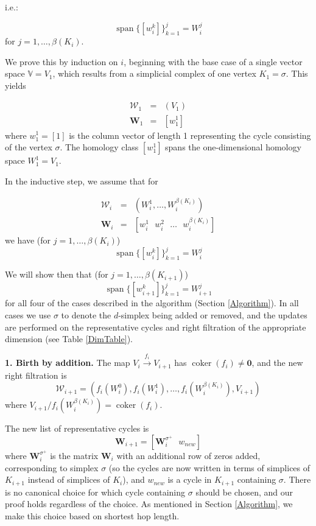 \documentclass[12pt]{article}
\DeclareMathOperator{\coker}{coker}
\DeclareMathOperator{\spn}{span}
\begin{document}
i.e.:

\begin{equation}
\spn \{[w_i^k]\}_{k=1}^j = W_i^j
\end{equation}
for $j = 1,\ldots,\beta(K_i)$.

We prove this by induction on $i$, beginning with the base case of a single vector space $\mathbb{V} = V_1$, which results from a simplicial complex of one vertex $K_1 = \sigma$. This yields

\begin{eqnarray}
\mathcal{W}_1 & = & (V_1) \nonumber \\
\mathbf{W}_1 & = & [w_1^1] \nonumber
\end{eqnarray}
where $w_1^1 = [1]$ is the column vector of length 1 representing the cycle consisting of the vertex $\sigma$. The homology class $[w_1^1]$ spans the one-dimensional homology space $W_1^1 = V_1$.

In the inductive step, we assume that for

\begin{eqnarray}
\mathcal{W}_i & = & (W_i^1, \ldots, W_i^{\beta(K_i)}) \\
\mathbf{W}_i & = & [ w_i^1 \mbox{ } w_i^2 \mbox{ } \ldots \mbox{ } w_i^{\beta(K_i)}]
\end{eqnarray}
we have (for $j = 1,\ldots,\beta(K_i)$)
\[ \spn \{[w_i^k]\}_{k=1}^j = W_i^j \]

We will show then that (for $j = 1,\ldots,\beta(K_{i+1})$)
\begin{equation}
\spn \{[w_{i+1}^k]\}_{k=1}^j = W_{i+1}^j
\end{equation}
for all four of the cases described in the algorithm (Section \ref{Algorithm}). In all cases we use $\sigma$ to denote the $d$-simplex being added or removed, and the updates are performed on the representative cycles and right filtration of the appropriate dimension (see Table \ref{DimTable}).

\textbf{1. Birth by addition.} The map $V_i \overset{f_i}{\longrightarrow} V_{i+1}$ has $\coker(f_i) \neq \textbf{0}$, and the new right filtration is
\[ \mathcal{W}_{i+1} = (f_i(W_i^0), f_i(W_i^1), \ldots, f_i(W_i^{\beta(K_i)}), V_{i+1}) \]
where $V_{i+1}/f_i(W_i^{\beta(K_i)}) = \coker(f_i)$.

The new list of representative cycles is
\[ \mathbf{W}_{i+1} = [\mathbf{W}_i^{\sigma^+} \mbox{ } w_{new}] \]
where $\mathbf{W}_i^{\sigma^+}$ is the matrix $\mathbf{W}_i$ with an additional row of zeros added, corresponding to simplex $\sigma$ (so the cycles are now written in terms of simplices of $K_{i+1}$ instead of simplices of $K_i$), and $w_{new}$ is a cycle in $K_{i+1}$ containing $\sigma$. There is no canonical choice for which cycle containing $\sigma$ should be chosen, and our proof holds regardless of the choice. As mentioned in Section \ref{Algorithm}, we make this choice based on shortest hop length.
\end{document}
